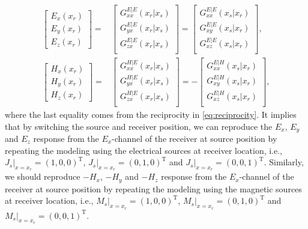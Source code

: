 \documentclass[a4paper,10pt]{article}
\begin{document}
\begin{subequations}
  \begin{align}
  \begin{bmatrix}
    E_x(x_r)\\
    E_y(x_r)\\
    E_z(x_r)
  \end{bmatrix} = &\begin{bmatrix}
    G_{xx}^{E|E}(x_r|x_s)\\
    G_{yx}^{E|E}(x_r|x_s)\\
    G_{zx}^{E|E}(x_r|x_s)\\
  \end{bmatrix}=\begin{bmatrix}
  G_{xx}^{E|E}(x_s|x_r)\\
  G_{xy}^{E|E}(x_s|x_r)\\
  G_{xz}^{E|E}(x_s|x_r)\\
  \end{bmatrix},\\
  \begin{bmatrix}
    H_x(x_r)\\
    H_y(x_r)\\
    H_z(x_r)
  \end{bmatrix} = &\begin{bmatrix}
    G_{xx}^{H|E}(x_r|x_s)\\
    G_{yx}^{H|E}(x_r|x_s)\\
    G_{zx}^{H|E}(x_r|x_s)\\
  \end{bmatrix}=-\begin{bmatrix}
  G_{xx}^{E|H}(x_s|x_r)\\
  G_{xy}^{E|H}(x_s|x_r)\\
  G_{xz}^{E|H}(x_s|x_r)\\
  \end{bmatrix},
  \end{align}
\end{subequations}
where the last equality comes from the reciprocity in \eqref{eq:reciprocity}. It implies that by switching the source and receiver position, we can reproduce the $E_x$, $E_y$ and $E_z$ response from the $E_x$-channel of the receiver at source position by repeating the modeling using the electrical sources at receiver location, i.e., $J_s|_{x=x_r}=(1,0,0)^\mathrm{T}$, $J_s|_{x=x_r}=(0,1,0)^\mathrm{T}$ and $J_s|_{x=x_r}=(0,0,1)^\mathrm{T}$. Similarly, we should reproduce  $-H_x$, $-H_y$ and $-H_z$ response from  the $E_x$-channel of the receiver at source position by repeating the modeling using the magnetic sources at receiver location, i.e., $M_s|_{x=x_r}=(1,0,0)^\mathrm{T}$, $M_s|_{x=x_r}=(0,1,0)^\mathrm{T}$ and $M_s|_{x=x_r}=(0,0,1)^\mathrm{T}$.
\end{document}
